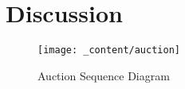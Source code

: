 \section{Discussion}
\label{sec:discussion}

\begin{figure}[H]
    \centering
    \texttt{[image: \_content/auction]}
    \caption{Auction Sequence Diagram}
    \label{fig:auction}
\end{figure}
